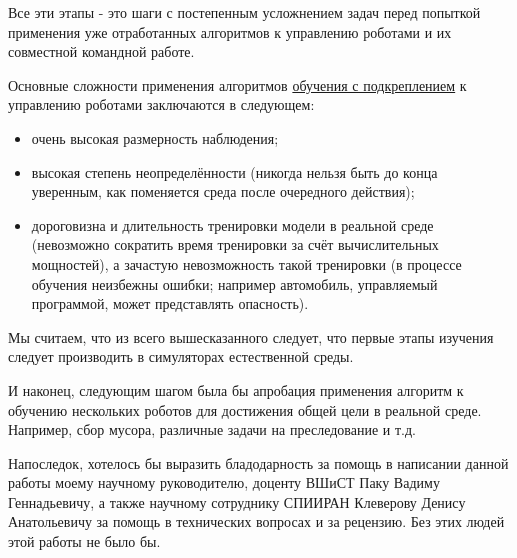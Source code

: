 Все эти этапы - это шаги с постепенным усложнением задач перед попыткой применения уже отработанных алгоритмов к управлению роботами и их совместной командной работе.

Основные сложности применения алгоритмов \hyperref[acr:rl]{обучения с подкреплением} к управлению роботами заключаются в следующем:
\begin{itemize}
    \item очень высокая размерность наблюдения;
    \item высокая степень неопределённости (никогда нельзя быть до конца уверенным, как поменяется среда после очередного действия);
    \item дороговизна и длительность тренировки модели в реальной среде (невозможно сократить время тренировки за счёт вычислительных мощностей), а зачастую невозможность такой тренировки (в процессе обучения неизбежны ошибки; например автомобиль, управляемый программой, может представлять опасность).
\end{itemize}

Мы считаем, что из всего вышесказанного следует, что первые этапы изучения следует производить в симуляторах естественной среды.

И наконец, следующим шагом была бы апробация применения алгоритм к обучению нескольких роботов для достижения общей цели в реальной среде. Например, сбор мусора, различные задачи на преследование и т.д.

Напоследок, хотелось бы выразить бладодарность за помощь в написании данной работы моему научному руководителю, доценту ВШиСТ Паку Вадиму Геннадьевичу, а также научному сотруднику СПИИРАН Клеверову Денису Анатольевичу за помощь в технических вопросах и за рецензию. Без этих людей этой работы не было бы.
